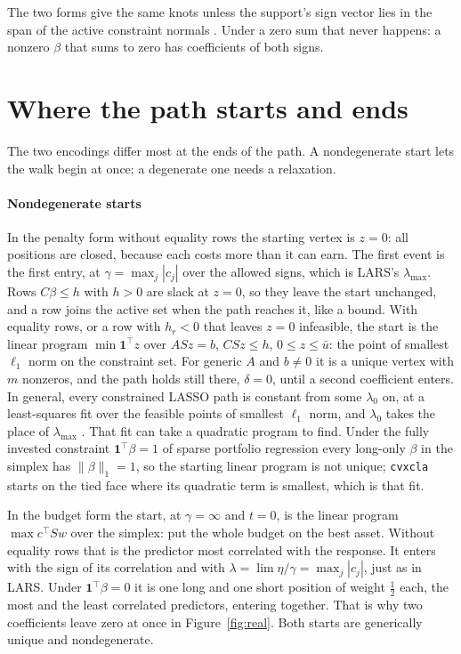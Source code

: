 \documentclass[11pt]{article}
\theoremstyle{remark}
\newcommand{\trans}{^{\top}}
\newcommand{\one}{\mathbf{1}}
\begin{document}
The two forms give the same knots unless the support's sign vector lies in the span of
the active constraint normals \cite[Corollary~1 and Proposition~1]{perspective}. Under a
zero sum that never happens: a nonzero $\beta$ that sums to zero has coefficients of
both signs.

\section{Where the path starts and ends}
\label{sec:starts}

The two encodings differ most at the ends of the path. A nondegenerate start lets the
walk begin at once; a degenerate one needs a relaxation.

\paragraph{Nondegenerate starts} In the penalty form without equality rows the starting
vertex is $z=0$: all positions are closed, because each costs more than it can earn.
The first event is the first entry, at $\gamma=\max_j|c_j|$ over the allowed signs,
which is LARS's $\lambda_{\max}$. Rows $C\beta\le h$ with $h>0$ are slack at $z=0$, so
they leave the start unchanged, and a row joins the active set when the path reaches
it, like a bound. With equality rows, or a row with $h_r<0$ that leaves $z=0$
infeasible, the start is the linear program $\min\one\trans z$ over $ASz=b$,
$CSz\le h$, $0\le z\le\bar u$: the point of smallest $\ell_1$ norm on the constraint
set. For generic $A$ and $b\ne0$ it is a unique vertex with $m$ nonzeros, and the path
holds still there, $\delta=0$, until a second coefficient enters. In general, every
constrained LASSO path is constant from some $\lambda_0$ on, at a least-squares fit
over the feasible points of smallest $\ell_1$ norm, and $\lambda_0$ takes the place of
$\lambda_{\max}$ \cite[Proposition~3]{perspective}. That fit can take a quadratic
program to find. Under the fully invested constraint $\one\trans\beta=1$ of sparse
portfolio regression \cite{brodie2009} every long-only $\beta$ in the simplex has
$\|\beta\|_1=1$, so the starting linear program is not unique; \texttt{cvxcla} starts
on the tied face where its quadratic term is smallest, which is that fit.

In the budget form the start, at $\gamma=\infty$ and $t=0$, is the linear program
$\max c\trans Sw$ over the simplex: put the whole budget on the best asset. Without
equality rows that is the predictor most correlated with the response. It enters with
the sign of its correlation and with $\lambda=\lim\eta/\gamma=\max_j|c_j|$, just as in
LARS. Under $\one\trans\beta=0$ it is one long and one short position of weight
$\tfrac12$ each, the most and the least correlated predictors, entering together. That
is why two coefficients leave zero at once in Figure~\ref{fig:real}. Both starts are
generically unique and nondegenerate.
\end{document}
